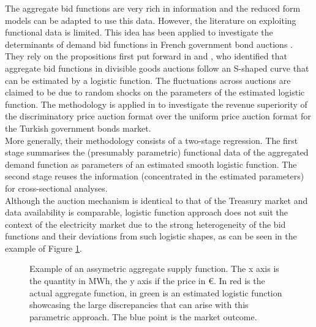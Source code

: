 The aggregate bid functions are very rich in information and the reduced form models can be adapted to use this data. However, the literature on exploiting functional data is limited. This idea has been applied to investigate the determinants of demand bid functions in French government bond auctions \cite{preget2005treasury}. They rely on the propositions first put forward in \cite{boukai1998market} and \cite{berg1999bid}, who identified that aggregate bid functions in divisible goods auctions follow an S-shaped curve that can be estimated by a logistic function. The fluctuations across auctions are claimed to be due to random shocks on the parameters of the estimated logistic function. The methodology is applied in \cite{ozcan2004logistic} to investigate the revenue superiority of the discriminatory price auction format over the uniform price auction format for the Turkish government bonds market.\\

More generally, their methodology consists of a two-stage regression. The first stage summarises the (presumably parametric) functional data of the aggregated demand function as parameters of an estimated smooth logistic function. The second stage reuses the information (concentrated in the estimated parameters) for cross-sectional analyses.\\

Although the auction mechanism is identical to that of the Treasury market and data availability is comparable, logistic function approach does not suit the context of the electricity market due to the strong heterogeneity of the bid functions and their deviations from such logistic shapes, as can be seen in the example of Figure \ref{assymetry}. \\

\begin{figure}[!ht]
\begin{center}  \end{center}
\caption{Example of an assymetric aggregate supply function. The x axis is the quantity in MWh, the y axis if the price in €. In red is the actual aggregate function, in green is an estimated logistic function showcasing the large discrepancies that can arise with this parametric approach. The blue point is the market outcome. }
\label{assymetry}
\end{figure}

